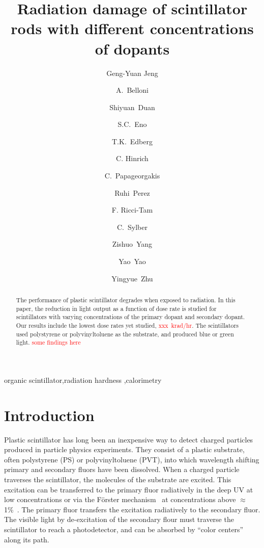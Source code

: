 \documentclass[review]{elsarticle}
\begin{document}
\begin{frontmatter}

\title{Radiation damage of scintillator rods with different concentrations of dopants
}


\author[umd]{Geng-Yuan Jeng}
\author[umd]{A.~Belloni}
\author[umd]{Shiyuan~Duan}
\author[umd]{S.C.~Eno}
\author[umd]{T.K.~Edberg}
\author[umd]{C. Hinrich}
\author[umd]{C.~Papageorgakis}
\author[umd]{Ruhi~Perez}
\author[umd]{F. Ricci-Tam}
\author[umd]{C.~Sylber}
\author[umd]{Zishuo~Yang}
\author[umd]{Yao~Yao}
\author[umd]{Yingyue~Zhu}

\address[umd]{Dept. Physics, U. Maryland, College Park MD 30742 USA}



\begin{abstract}
The performance of plastic scintillator degrades when exposed to radiation. 
In this paper, the reduction in light output  as a function of dose rate
is studied for scintillators
with varying concentrations of the primary dopant and secondary dopant.
Our results include the lowest dose rates yet studied, \textcolor{red}{xxx~krad/hr}.
The scintillators used polystyrene or polyvinyltoluene as the substrate, and
produced blue or green light. \textcolor{red}{some findings here}
\end{abstract}

\begin{keyword}
organic scintillator\sep radiation hardness \sep calorimetry
\end{keyword}

\end{frontmatter}

\linenumbers

\section{Introduction}
Plastic scintillator has long been an inexpensive way to detect charged particles produced in particle physics experiments.
They consist of a plastic substrate, 
often polystyrene (PS) or polyvinyltoluene (PVT),
into which wavelength 
shifting primary and secondary fluors have been dissolved.
When a charged particle traverses the scintillator, the molecules of the substrate are excited.  
This excitation can be transferred to the primary fluor radiatively in the deep UV at low concentrations or via the F{\"o}rster 
mechanism~\cite{forster} at concentrations above $\approx$ 1\%~\cite{birks}.  
The primary fluor transfers the excitation radiatively to the secondary fluor.  
The visible light by de-excitation of the secondary flour
must traverse the scintillator to reach a photodetector, and can be absorbed by ``color centers'' along its path.
\end{document}
